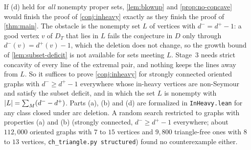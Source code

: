 \begin{remark}\label{rem:inheavy-gap}
If (d) held for \emph{all} nonempty proper sets, \cref{lem:blowup} and
\cref{prop:no-concave} would finish the proof of \cref{conj:inheavy} exactly as they
finish the proof of \cref{thm:main}. The obstacle is the nonempty set $L$ of vertices
with $d^-=d^+-1$: a good vertex $v$ of $D_T$ that lies in $L$ fails the conjecture in $D$
only through $d^-(v)=d^+(v)-1$, which the deletion does not change, so the growth
bound of \cref{lem:subset-deficit} is not available for sets meeting $L$. Stage~3 needs
strict concavity of every line of the extremal pair, and nothing keeps the lines away
from $L$. So it suffices to prove \cref{conj:inheavy} for strongly connected oriented
graphs with $d^-\ge d^+-1$ everywhere whose in-heavy vertices are non-Seymour and
satisfy the subset deficit, and in which the set $L$ is nonempty with
$\lvert L\rvert=\sum_{M}(d^--d^+)$. Parts (a), (b) and (d) are formalized in
\texttt{InHeavy.lean} for any class closed under arc deletion. A random search
restricted to graphs with properties (a) and (b) (strongly connected, $d^-\ge d^+-1$
everywhere; about $112{,}000$ oriented graphs with $7$ to $15$ vertices and $9{,}800$
triangle-free ones with $8$ to $13$ vertices, \texttt{ch\_triangle.py structured})
found no counterexample either.
\end{remark}


